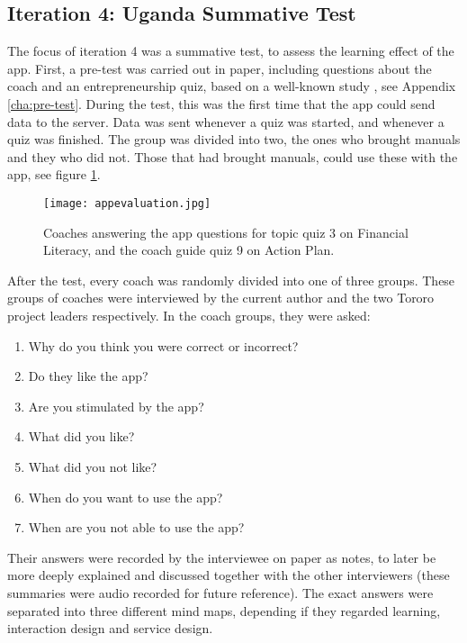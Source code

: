 \subsection{Iteration 4: Uganda Summative Test}

The focus of iteration 4 was a summative test, to assess the learning effect of the app. First, a pre-test was carried out in paper, including questions about the coach and an entrepreneurship quiz, based on a well-known study \citep{general-entrepreneurship-quiz}, see Appendix \ref{cha:pre-test}. During the test, this was the first time that the app could send data to the server. Data was sent whenever a quiz was started, and whenever a quiz was finished. The group was divided into two, the ones who brought manuals and they who did not. Those that had brought manuals, could use these with the app, see figure \ref{fig:appevaluation}.

\begin{figure}[h]
    \centering
    \texttt{[image: appevaluation.jpg]}
    \caption{Coaches answering the app questions for topic quiz 3 on Financial Literacy, and the coach guide quiz 9 on Action Plan.}
    \label{fig:appevaluation}
\end{figure}

After the test, every coach was randomly divided into one of three groups. These groups of coaches were interviewed by the current author and the two Tororo project leaders respectively. In the coach groups, they were asked:

\begin{enumerate}
\item Why do you think you were correct or incorrect?
\item Do they like the app?
\item Are you stimulated by the app?
\item What did you like?
\item What did you not like?
\item When do you want to use the app?
\item When are you not able to use the app?
\end{enumerate}

Their answers were recorded by the interviewee on paper as notes, to later be more deeply explained and discussed together with the other interviewers (these summaries were audio recorded for future reference). The exact answers were separated into three different mind maps, depending if they regarded learning, interaction design and service design.


